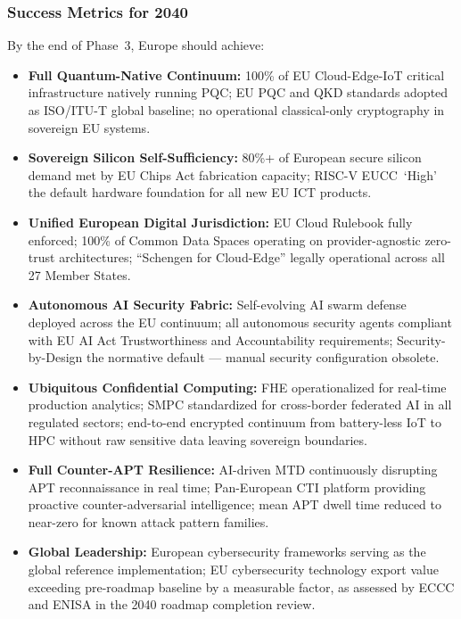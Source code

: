 \documentclass{ieeeaccess}
\begin{document}
\subsubsection*{Success Metrics for 2040}
By the end of Phase~3, Europe should achieve:
\begin{itemize}
    \item \textbf{Full Quantum-Native Continuum:}
    100\% of EU Cloud-Edge-IoT critical infrastructure natively running
    PQC; EU PQC and QKD standards adopted as ISO/ITU-T global baseline;
    no operational classical-only cryptography in sovereign EU systems.

    \item \textbf{Sovereign Silicon Self-Sufficiency:}
    80\%+ of European secure silicon demand met by EU Chips Act
    fabrication capacity; RISC-V EUCC~`High' the default hardware
    foundation for all new EU ICT products.

    \item \textbf{Unified European Digital Jurisdiction:}
    EU Cloud Rulebook fully enforced; 100\% of Common Data Spaces
    operating on provider-agnostic zero-trust architectures;
    ``Schengen for Cloud-Edge'' legally operational across all 27
    Member States.

    \item \textbf{Autonomous AI Security Fabric:}
    Self-evolving AI swarm defense deployed across the EU continuum;
    all autonomous security agents compliant with EU AI Act
    Trustworthiness and Accountability requirements; Security-by-Design
    the normative default --- manual security configuration obsolete.

    \item \textbf{Ubiquitous Confidential Computing:}
    FHE operationalized for real-time production analytics; SMPC
    standardized for cross-border federated AI in all regulated
    sectors; end-to-end encrypted continuum from battery-less IoT to
    HPC without raw sensitive data leaving sovereign boundaries.

    \item \textbf{Full Counter-APT Resilience:}
    AI-driven MTD continuously disrupting APT reconnaissance in real
    time; Pan-European CTI platform providing proactive
    counter-adversarial intelligence; mean APT dwell time reduced to
    near-zero for known attack pattern families.

    \item \textbf{Global Leadership:}
    European cybersecurity frameworks serving as the global reference
    implementation; EU cybersecurity technology export value exceeding
    pre-roadmap baseline by a measurable factor, as assessed by ECCC
    and ENISA in the 2040 roadmap completion review.
\end{itemize}
\end{document}
